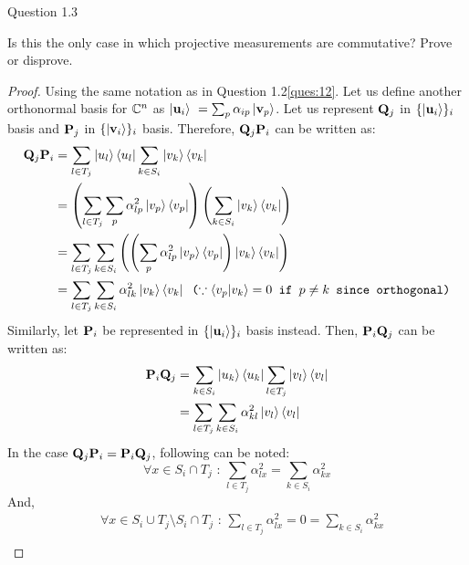 \begin{solution}{Question 1.3}\label{ques:13}
    \begin{question}
    Is this the only case in which projective measurements are commutative? Prove or disprove.
    \end{question}
    \tcblower{}
    \begin{proof}
    Using the same notation as in Question 1.2\ref{ques:12}. Let us define another orthonormal basis for $\mathbb{C}^n$ as $\ket{\mathbf{u}_i}\ = \sum_p \alpha_{ip}\ket{\mathbf{v}_p}$. Let us represent $\mathbf{Q}_j$ in $\{\ket{\mathbf{u}_i}\}_i$ basis and $\mathbf{P}_j$ in $\{\ket{\mathbf{v}_i}\}_i$ basis. Therefore, $\mathbf{Q}_j \mathbf{P}_i$ can be written as:
    \begin{equation}
        \begin{split}
            \mathbf{Q}_j\mathbf{P}_i &= \sum_{l\in T_j}\ket{u_l}\bra{u_l} \sum_{k\in S_i}\ket{v_k}\bra{v_k} \\ 
            &=\left( \sum_{l\in T_j}\sum_{p}\alpha^2_{lp}\ket{v_p}\bra{v_p} \right) \left( \sum_{k\in S_i} \ket{v_k}\bra{v_k} \right)\\
            &= \sum_{l\in T_j}\sum_{k\in S_i} \left( \left(\sum_{p}\alpha^2_{lp}\ket{v_p}\bra{v_p} \right) \ket{v_k}\bra{v_k} \right)\\
            &= \sum_{l\in T_j} \sum_{k\in S_i}\alpha^2_{lk}\ket{v_k}\bra{v_k} \texttt{ 
        ($\because \braket{v_p|v_k}=0$ if $p\neq k$ since orthogonal)}
        \end{split}
    \end{equation}
    Similarly, let $\mathbf{P}_i$ be represented in $\{\ket{\mathbf{u}_i}\}_i$ basis instead. Then, $\mathbf{P}_i\mathbf{Q}_j$ can be written as:
    \begin{equation}
        \begin{split}
            \mathbf{P}_i\mathbf{Q}_j &= \sum_{k\in S_i}\ket{u_k}\bra{u_k} \sum_{l\in T_j}\ket{v_l}\bra{v_l} \\ 
            &= \sum_{l\in T_j} \sum_{k\in S_i}\alpha^2_{kl}\ket{v_l}\bra{v_l}
        \end{split}
    \end{equation}
    In the case $\mathbf{Q}_j\mathbf{P}_i = \mathbf{P}_i\mathbf{Q}_j$, following can be noted:
    \begin{equation}
        \forall x\in S_i\cap T_j \text{ : }\sum_{l\in T_j}\alpha^2_{lx} = \sum_{k\in S_i}\alpha^2_{kx}
    \end{equation}
    And,
    \begin{equation}
        \label{eq:9}
        \begin{split}
            &\forall x\in S_i\cup T_j \setminus S_i\cap T_j \text{ : }\sum_{l\in T_j}\alpha^2_{lx} = 0 = \sum_{k\in S_i}\alpha^2_{kx}\\

\end{split}
\end{equation}
\end{proof}
\end{solution}

